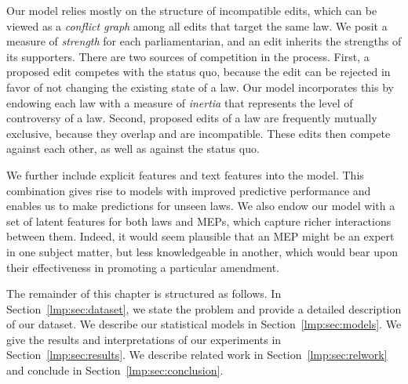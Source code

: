 Our model relies mostly on the structure of incompatible edits, which can be viewed as a {\em conflict graph} among all edits that target the same law.
We posit a measure of {\em strength} for each parliamentarian, and an edit inherits the strengths of its supporters.
There are two sources of competition in the process.
First, a proposed edit competes with the status quo, because the edit can be rejected in favor of not changing the existing state of a law.
Our model incorporates this by endowing each law with a measure of {\em inertia} that represents the level of controversy of a law.
Second, proposed edits of a law are frequently mutually exclusive, because they overlap and are incompatible.
These edits then compete against each other, as well as against the status quo.

We further include explicit features and text features into the model.
This combination gives rise to models with improved predictive performance and enables us to make predictions for unseen laws.
We also endow our model with a set of latent features for both laws and MEPs, which capture richer interactions between them.
Indeed, it would seem plausible that an MEP might be an expert in one subject matter, but less knowledgeable in another, which would bear upon their effectiveness in promoting a particular amendment.

The remainder of this chapter is structured as follows.
In Section~\ref{lmp:sec:dataset}, we state the problem and provide a detailed description of our dataset.
We describe our statistical models in Section~\ref{lmp:sec:models}.
We give the results and interpretations of our experiments in Section~\ref{lmp:sec:results}.
We describe related work in Section~\ref{lmp:sec:relwork} and conclude in Section~\ref{lmp:sec:conclusion}.
